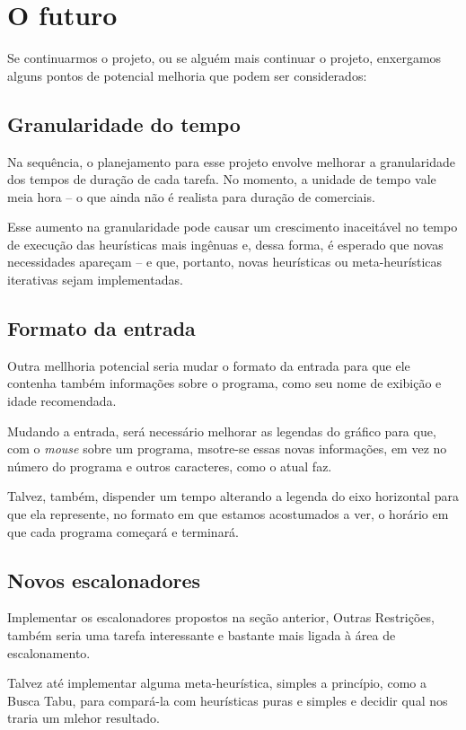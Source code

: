 \section{O futuro}


Se continuarmos o projeto, ou se alguém mais continuar o projeto, enxergamos alguns pontos de potencial melhoria que podem ser considerados:

\subsection{Granularidade do tempo}

Na sequência, o planejamento para esse projeto envolve melhorar a granularidade dos tempos de duração de cada tarefa. No momento, a unidade de tempo vale meia hora -- o que ainda não é realista para duração de comerciais.

Esse aumento na granularidade pode causar um crescimento inaceitável no tempo de execução das heurísticas mais ingênuas e, dessa forma, é esperado que novas necessidades apareçam -- e que, portanto, novas heurísticas ou meta-heurísticas iterativas sejam implementadas.

\subsection{Formato da entrada}

Outra mellhoria potencial seria mudar o formato da entrada para que ele contenha também informações sobre o programa, como seu nome de exibição e idade recomendada.

Mudando a entrada, será necessário melhorar as legendas do gráfico para que, com o \textit{mouse} sobre um programa, msotre-se essas novas informações, em vez no número do programa e outros caracteres, como o atual faz.

Talvez, também, dispender um tempo alterando a legenda do eixo horizontal para que ela represente, no formato em que estamos acostumados a ver, o horário em que cada programa começará e terminará.

\subsection{Novos escalonadores}

Implementar os escalonadores propostos na seção anterior, Outras Restrições, também seria uma tarefa interessante e bastante mais ligada à área de escalonamento.

Talvez até implementar alguma meta-heurística, simples a princípio, como a Busca Tabu, para compará-la com heurísticas puras e simples e decidir qual nos traria um mlehor resultado. 

